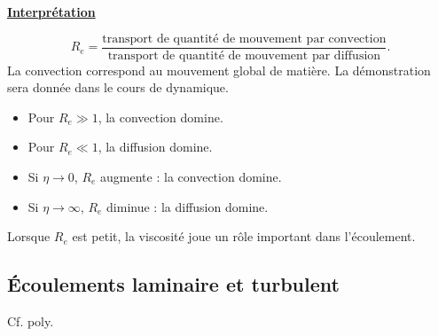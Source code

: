 \documentclass[11pt,a4paper]{article}
\newcommand{\titr}[1]{\par\needspace{4\baselineskip}\textbf{\underline{#1}}\par}
\begin{document}
\titr{Interprétation}
\[R_e=\frac{\text{transport de quantité de mouvement par convection}}{\text{transport de quantité de mouvement par diffusion}}.\]
La convection correspond au mouvement global de matière. La démonstration sera donnée dans le cours de dynamique.
\begin{itemize}
\item Pour $R_e\gg1$, la convection domine.
\item Pour $R_e\ll1$, la diffusion domine.
\item Si $\eta\to0$, $R_e$ augmente : la convection domine.
\item Si $\eta\to\infty$, $R_e$ diminue : la diffusion domine.
\end{itemize}
Lorsque $R_e$ est petit, la viscosité joue un rôle important dans l'écoulement.
\subsection{Écoulements laminaire et turbulent}
Cf. poly.
\end{document}
